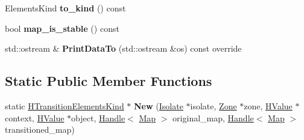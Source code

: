 \begin{DoxyCompactItemize}
\item 
Elements\+Kind {\bfseries to\+\_\+kind} () const \hypertarget{classv8_1_1internal_1_1_h_transition_elements_kind_a7e98eedd9fee17d7790b06635a2ade46}{}\label{classv8_1_1internal_1_1_h_transition_elements_kind_a7e98eedd9fee17d7790b06635a2ade46}

\item 
bool {\bfseries map\+\_\+is\+\_\+stable} () const \hypertarget{classv8_1_1internal_1_1_h_transition_elements_kind_af891eee2f4d313f2ae3d0603dbb04842}{}\label{classv8_1_1internal_1_1_h_transition_elements_kind_af891eee2f4d313f2ae3d0603dbb04842}

\item 
std\+::ostream \& {\bfseries Print\+Data\+To} (std\+::ostream \&os) const  override\hypertarget{classv8_1_1internal_1_1_h_transition_elements_kind_af892dd71d37e077c0a7cdfe0cc44e1a5}{}\label{classv8_1_1internal_1_1_h_transition_elements_kind_af892dd71d37e077c0a7cdfe0cc44e1a5}

\end{DoxyCompactItemize}
\subsection*{Static Public Member Functions}
\begin{DoxyCompactItemize}
\item 
static \hyperlink{classv8_1_1internal_1_1_h_transition_elements_kind}{H\+Transition\+Elements\+Kind} $\ast$ {\bfseries New} (\hyperlink{classv8_1_1internal_1_1_isolate}{Isolate} $\ast$isolate, \hyperlink{classv8_1_1internal_1_1_zone}{Zone} $\ast$zone, \hyperlink{classv8_1_1internal_1_1_h_value}{H\+Value} $\ast$context, \hyperlink{classv8_1_1internal_1_1_h_value}{H\+Value} $\ast$object, \hyperlink{classv8_1_1internal_1_1_handle}{Handle}$<$ \hyperlink{classv8_1_1internal_1_1_map}{Map} $>$ original\+\_\+map, \hyperlink{classv8_1_1internal_1_1_handle}{Handle}$<$ \hyperlink{classv8_1_1internal_1_1_map}{Map} $>$ transitioned\+\_\+map)\hypertarget{classv8_1_1internal_1_1_h_transition_elements_kind_adc3962aca9f5275bbaa548c7a09a478d}{}\label{classv8_1_1internal_1_1_h_transition_elements_kind_adc3962aca9f5275bbaa548c7a09a478d}

\end{DoxyCompactItemize}
